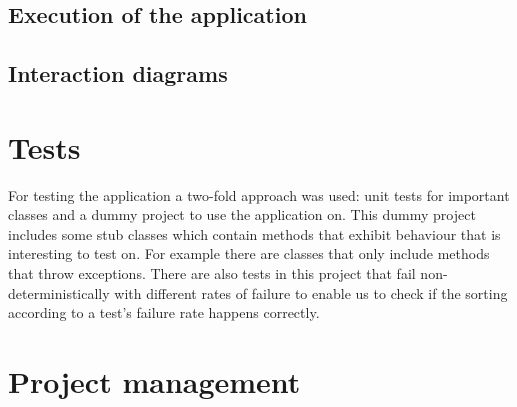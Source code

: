 \documentclass[i2]{oss}
\begin{document}
\subsection{Execution of the application}


\subsection{Interaction diagrams}
\label{ssec:Interactiedia}




\section{Tests}
\label{ssec:tests}

For testing the application a two-fold approach was used: unit tests for
important classes and a dummy project to use the application on.
This dummy project includes some stub classes which contain methods that
exhibit behaviour that is interesting to test on.
For example there are classes that only include methods that throw 
exceptions.
There are also tests in this project that fail non-deterministically with 
different rates of failure to enable us to check if the sorting according 
to a test's failure rate happens correctly.



\section{Project management}
\label{ssec:Projectmanag}
\end{document}
